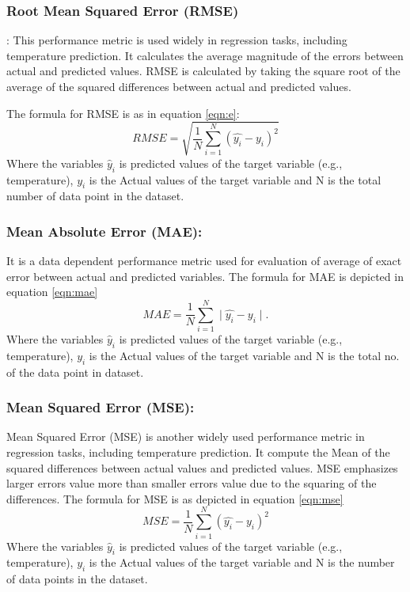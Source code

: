 \documentclass[sn-mathphys,Numbered]{sn-jnl}
\theoremstyle{thmstyleone}
\theoremstyle{thmstyletwo}
\theoremstyle{thmstylethree}
\begin{document}
\subsubsection{Root Mean Squared Error (RMSE)}:
This performance metric is used widely in regression tasks, including temperature prediction. It calculates the average magnitude of the errors between actual and predicted values. RMSE is calculated by taking the square root of the average of the squared differences between actual and predicted values.

The formula for RMSE is as in equation \ref{eqn:e}:
\begin{equation}
\label{eqn:e}
RMSE = \sqrt {\frac{1}{N} \sum_{i=1}^{N} (\hat{y_{i}} - y_{i})^2}
\end{equation}
Where the variables $\hat{y}_i$ is predicted values of the target variable (e.g., temperature), $y_i$ is the Actual values of the target variable and N is the total number of data point in the dataset.
\subsubsection{Mean Absolute Error (MAE):} It is a data dependent performance metric used for evaluation of average of exact error between actual and predicted variables. The formula for MAE is depicted in equation \ref{eqn:mae}
\begin{equation}
\label{eqn:mae}
MAE = \frac{1}{N} \sum_{i=1}^{N} \mid\hat{y_{i}} - y_{i}\mid .
\end{equation}
Where the variables $\hat{y}_i$ is predicted values of the target variable (e.g., temperature), $y_i$ is the Actual values of the target variable and N is the total no. of the data point in dataset.

\subsubsection{Mean Squared Error (MSE):}
Mean Squared Error (MSE) is another widely used performance metric in regression tasks, including temperature prediction. It compute the Mean of the squared differences between actual values and predicted values. MSE emphasizes larger errors value more than smaller errors value due to the squaring of the differences.
The formula for MSE is as depicted in equation \ref{eqn:mse}
\begin{equation}
\label{eqn:mse}
MSE = \frac{1}{N} \sum_{i=1}^{N} (\hat{y_{i}} - y_{i})^2
\end{equation}
Where the variables $\hat{y}_i$ is predicted values of the target variable (e.g., temperature), $y_i$ is the Actual values of the target variable and N is the number of data points in the dataset.
\end{document}
